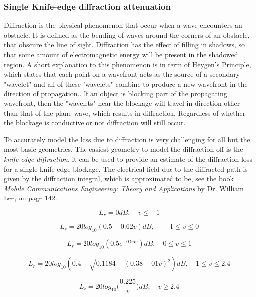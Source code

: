 \subsubsection{Single Knife-edge diffraction attenuation}
Diffraction is the physical phenomenon that occur when a wave encounters an obstacle. It is defined as the bending of waves around the corners of an obstacle, that obscure the line of sight. Diffraction has the effect of filling in shadows, so that some amount of electromagnetic energy will be present in the shadowed region. A short explanation to this phenomenon is in term of Heygen's Principle, which states that each point on a wavefront acts as the source of a secondary "wavelet" and all of these "wavelets" combine to produce a new wavefront in the direction of propagation.\cite{Huygens}. If an object is blocking part of the propagating wavefront, then the "wavelets" near the blockage will travel in direction other than that of the plane wave, which results in diffraction. Regardless of whether the blockage is conductive or not diffraction will still occur.

To accurately model the loss due to diffraction is very challenging for all but the most basic geometries. The easiest geometry to model the diffraction off is the \textit{knife-edge diffraction}, it can be used to provide an estimate of the diffraction loss for a single knife-edge blockage. The electrical field due to the diffracted path is given by the diffraction integral, which is approximated to be, see the book \textit{Mobile Communications Engineering: Theory and Applications} by Dr. William Lee, on page 142:

\begin{equation}
    L_r = 0 dB, \quad v \leq -1
\end{equation}

\begin{equation}
    L_r = 20log_{10}(0.5-0.62v) dB, \quad -1\leq v\leq0
\end{equation}

\begin{equation}
    L_r = 20log_{10}(0.5e^{-0.95v}) dB, \quad 0\leq v\leq 1
\end{equation}

\begin{equation}
    L_r = 20log_{10}(0.4-\sqrt{0.1184-(0.38-01v)^2}) dB, \quad 1\leq v\leq 2.4
\end{equation}

\begin{equation}
    L_r = 20log_{10}\Big(\frac{0.225}{v}\Big) dB, \quad  v \geq 2.4
\end{equation}

